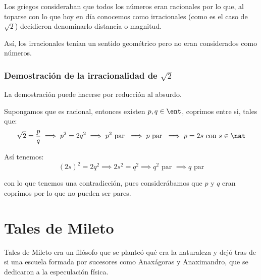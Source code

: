 \documentclass{apuntes}
\begin{document}
Los griegos consideraban que todos los números eran racionales por lo que, al toparse con lo que hoy en día conocemos como irracionales (como es el caso de $\sqrt{2}$) decidieron denominarlo distancia o magnitud.

Así, los irracionales tenían un sentido geométrico pero no eran considerados como números.

\subsubsection{Demostración de la irracionalidad de $\sqrt{2}$}

La demostración puede hacerse por reducción al absurdo.

Supongamos que es racional, entonces existen $p,q \in \ent$, coprimos entre si, tales que:
\[\sqrt{2} = \frac{p}{q} \implies p^2=2q^2 \implies p^2 \text{ par } \implies p \text{ par } \implies p=2s \text{ con } s \in \nat\]

Así tenemos:
\[(2s)^2 = 2q^2 \implies 2s^2 = q^2 \implies q^2 \text{ par } \implies q \text{ par}\]

con lo que tenemos una contradicción, pues considerábamos que $p$ y $q$ eran coprimos por lo que no pueden ser pares.

\section{Tales de Mileto}
Tales de Mileto era un filósofo que se planteó qué era la naturaleza y dejó tras de si una escuela formada por sucesores como Anaxágoras y Anaximandro, que se dedicaron a la especulación física.
\end{document}

